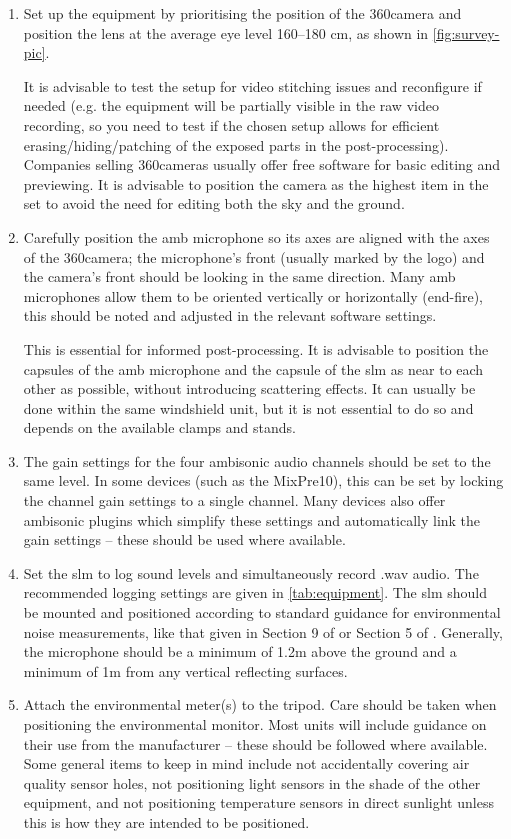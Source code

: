    \begin{enumerate}
     \item Set up the equipment by prioritising the position of the 360\degree camera and position the lens at the average eye level 160--180 cm, as shown in \cref{fig:survey-pic}.

           It is advisable to test the setup for video stitching issues and reconfigure if needed (e.g. the equipment will be partially visible in the raw video recording, so you need to test if the chosen setup allows for efficient erasing/hiding/patching of the exposed parts in the post-processing). Companies selling 360\degree cameras usually offer free software for basic editing and previewing. It is advisable to position the camera as the highest item in the set to avoid the need for editing both the sky and the ground.
     \item Carefully position the \gls{amb} microphone so its axes are aligned with the axes of the 360\degree camera; the microphone's front (usually marked by the logo) and the camera's front should be looking in the same direction. Many \gls{amb} microphones allow them to be oriented vertically or horizontally (end-fire), this should be noted and adjusted in the relevant software settings.

           This is essential for informed post-processing. It is advisable to position the capsules of the \gls{amb} microphone and the capsule of the \gls{slm} as near to each other as possible, without introducing scattering effects. It can usually be done within the same windshield unit, but it is not essential to do so and depends on the available clamps and stands.
     \item The gain settings for the four ambisonic audio channels should be set to the same level. In some devices (such as the MixPre10), this can be set by locking the channel gain settings to a single channel. Many devices also offer ambisonic plugins which simplify these settings and automatically link the gain settings -- these should be used where available.
     \item Set the \gls{slm} to log sound levels and simultaneously record .wav audio. The recommended logging settings are given in \cref{tab:equipment}. The \gls{slm} should be mounted and positioned according to standard guidance for environmental noise measurements, like that given in Section 9 of \citet{ISO1996Part1} or Section 5 of \citet{ANSIS129Part1}. Generally, the microphone should be a minimum of 1.2m above the ground and a minimum of 1m from any vertical reflecting surfaces.
     \item Attach the environmental meter(s) to the tripod. Care should be taken when positioning the environmental monitor. Most units will include guidance on their use from the manufacturer -- these should be followed where available. Some general items to keep in mind include not accidentally covering air quality sensor holes, not positioning light sensors in the shade of the other equipment, and not positioning temperature sensors in direct sunlight unless this is how they are intended to be positioned.
   \end{enumerate}


